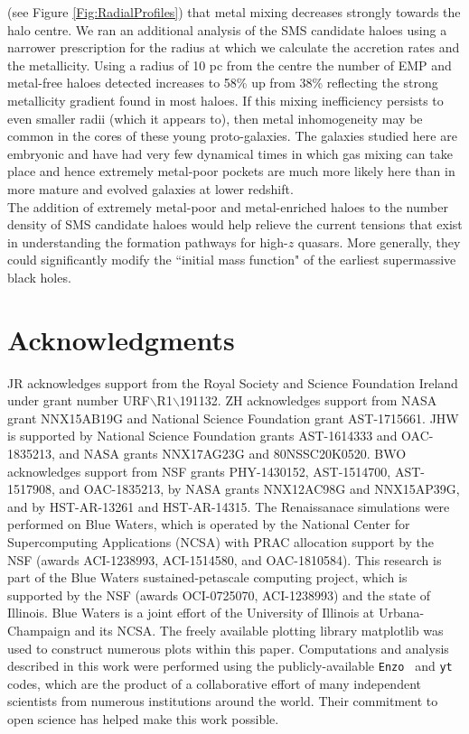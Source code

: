 \documentclass[twocolumn,iop,revtex4]{openjournal}
\newcommand{\enzo}{\texttt{Enzo~}}
\newcommand{\yt}{\texttt{yt}}
\begin{document}
(see Figure \ref{Fig:RadialProfiles}) that metal mixing decreases strongly towards the halo centre.
We ran an additional analysis of the SMS candidate haloes using a narrower prescription for the
radius at which we calculate the accretion rates and the metallicity. Using a radius of 10 pc
from the centre the number of EMP and metal-free haloes detected increases to 58\% up from 38\%
reflecting the strong metallicity gradient found in most haloes. 
If this mixing inefficiency persists to even smaller radii (which it appears to),
then metal inhomogeneity may be common in the cores of these young proto-galaxies. The galaxies
studied here are embryonic and have had very few dynamical times in which 
gas mixing can take place and hence extremely metal-poor pockets are much more likely here than
in more mature and evolved galaxies at lower redshift.\\
\indent  The addition of extremely metal-poor and metal-enriched haloes to the number density of SMS
candidate haloes would help relieve the current tensions that exist in understanding the formation
pathways for high-$z$ quasars. More generally, they could significantly modify the
``initial mass function" of the earliest supermassive black holes.

\section*{Acknowledgments}

\noindent JR acknowledges support from the Royal Society and Science Foundation Ireland under
grant number URF$\backslash$R1$\backslash$191132.
ZH acknowledges support from NASA grant NNX15AB19G and National Science Foundation grant AST-1715661.
JHW is supported by National Science Foundation grants AST-1614333 and
OAC-1835213, and NASA grants NNX17AG23G and 80NSSC20K0520.  
BWO acknowledges support from NSF  grants  PHY-1430152,  AST-1514700, AST-1517908, and  OAC-1835213,  by  NASA grants NNX12AC98G and NNX15AP39G, and by HST-AR-13261 and HST-AR-14315.  
The Renaissanace simulations were performed on Blue 
Waters, which is operated by the National Center for Supercomputing Applications (NCSA)
with PRAC allocation support by the NSF (awards ACI-1238993, ACI-1514580, and OAC-1810584).
This research is part of the Blue Waters sustained-petascale computing project, which
is supported by the NSF (awards OCI-0725070, ACI-1238993) and the state of
Illinois. Blue Waters is a joint effort of the University of Illinois at
Urbana-Champaign and its NCSA.  The freely available plotting library {\sc
matplotlib} \citep{matplotlib} was used to construct numerous plots within this
paper. Computations and analysis described in this work were performed using the
publicly-available \enzo \citep{Enzo_2014, Enzo_2019} and \yt{} \citep{YT} codes, which are the product of a
collaborative effort of many independent scientists from numerous institutions
around the world. Their commitment to open science
has helped make this work possible.



\end{document}

